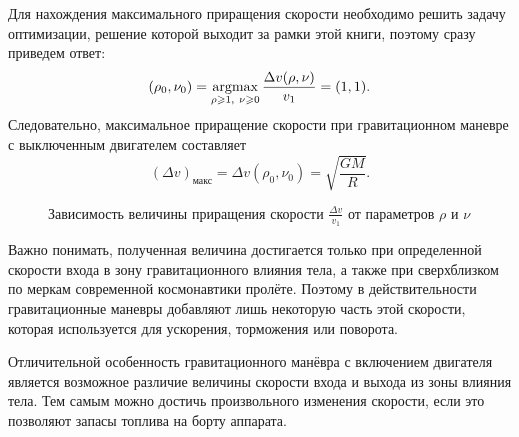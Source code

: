 Для нахождения максимального приращения скорости необходимо решить задачу оптимизации, решение которой выходит за рамки этой книги, поэтому сразу приведем ответ:
\begin{equation*}
    (\rho_0, \nu_0)
        = \underset{\rho \geqslant 1,~\nu \geqslant 0} {\operatorname{argmax}}\, \frac{\Delta v (\rho, \nu)}{v_1} 
        = (1, 1).
\end{equation*}
Следовательно, максимальное приращение скорости при гравитационном маневре с выключенным двигателем составляет
\begin{equation*}
    (\Delta v)_\text{макс}
        = \Delta v (\rho_0, \nu_0)
        = \sqrt{\frac{G M}{R}}.
\end{equation*}

\begin{wrapfigure}[11]{r}{0.45\tw}
    \vspace{-1.2pc}
    \caption{Зависимость величины приращения скорости $\frac{\Delta v}{v_1}$ от параметров $\rho$ и $\nu$}
\end{wrapfigure}
Важно понимать, полученная величина достигается только при определенной скорости входа в зону гравитационного влияния тела, а также при сверхблизком по меркам современной космонавтики пролёте. Поэтому в действительности гравитационные маневры добавляют лишь некоторую часть этой скорости, которая используется для ускорения, торможения или поворота.

Отличительной особенность гравитационного манёвра с включением двигателя является возможное различие величины скорости входа и выхода из зоны влияния тела. Тем самым можно достичь произвольного изменения скорости, если это позволяют запасы топлива на борту аппарата.

